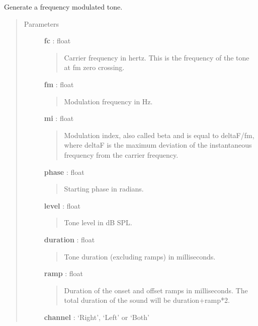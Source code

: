 \documentclass[a4paper,12pt,english]{sphinxmanual}
\begin{document}
\begin{fulllineitems}
\label{sndlib:sndlib.FMTone}
Generate a frequency modulated tone.
\begin{quote}\begin{description}
\item[{Parameters }] \leavevmode
\textbf{fc} : float
\begin{quote}

Carrier frequency in hertz. This is the frequency of the tone at fm zero crossing.
\end{quote}

\textbf{fm} : float
\begin{quote}

Modulation frequency in Hz.
\end{quote}

\textbf{mi} : float
\begin{quote}

Modulation index, also called beta and is equal to deltaF/fm, where
deltaF is the maximum deviation of the instantaneous frequency from
the carrier frequency.
\end{quote}

\textbf{phase} : float
\begin{quote}

Starting phase in radians.
\end{quote}

\textbf{level} : float
\begin{quote}

Tone level in dB SPL.
\end{quote}

\textbf{duration} : float
\begin{quote}

Tone duration (excluding ramps) in milliseconds.
\end{quote}

\textbf{ramp} : float
\begin{quote}

Duration of the onset and offset ramps in milliseconds.
The total duration of the sound will be duration+ramp*2.
\end{quote}

\textbf{channel} : `Right', `Left' or `Both'
\begin{quote}


\end{quote}
\end{description}
\end{quote}
\end{fulllineitems}
\end{document}
